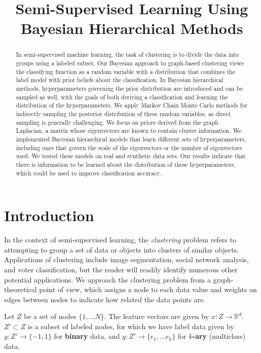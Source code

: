 \documentclass{siamart1116}
\title{Semi-Supervised Learning Using Bayesian Hierarchical Methods}
\author{\TheAuthors}
\date{}
\begin{document}
\maketitle
\setlength{\unitlength}{1in}
\setlength{\parindent}{0in}

\begin{abstract}

    In semi-supervised machine learning, the task of clustering is to divide the data into groups using a labeled subset. Our Bayesian approach to graph-based clustering views the classifying function as a random variable with a distribution that combines the label model with prior beliefs about the classification. In Bayesian hierarchical methods, hyperparameters governing the prior distribution are introduced and can be sampled as well, with the goals of both deriving a classification and learning the distribution of the hyperparameters. We apply Markov Chain Monte Carlo methods for indirectly sampling the posterior distribution of these random variables, as direct sampling is generally challenging. We focus on priors derived from the graph Laplacian, a matrix whose eigenvectors are known to contain cluster information. We implemented Bayesian hierarchical models that learn different sets of hyperparameters, including ones that govern the scale of the eigenvectors or the number of eigenvectors used. We tested these models on real and synthetic data sets. Our results indicate that there is information to be learned about the distribution of these hyperparameters, which could be used to improve classification accuracy.
\end{abstract}

\section{Introduction}
    In the context of semi-supervised learning, the \textit{clustering} problem refers to attempting to group a set of data or objects into clusters of similar objects. Applications of clustering include image segmentation, social network analysis, and voter classification, but the reader will readily identify numerous other potential applications. We approach the clustering problem from a graph-theoretical point of view, which assigns a node to each data value and weights on edges between nodes to indicate how related the data points are.

    Let $Z$ be a set of nodes $\{1, \ldots N\}$. The feature vectors are given by $x : Z \rightarrow \mathbb{R}^d$. $Z' \subset Z$ is a subset of labeled nodes, for which we have label data given by $y : Z' \to \{-1, 1\}$ for {\bf binary} data, and $y : Z' \to \{e_1, \ldots e_k\}$ for {\bf $k$-ary} (multiclass) data.
\end{document}
